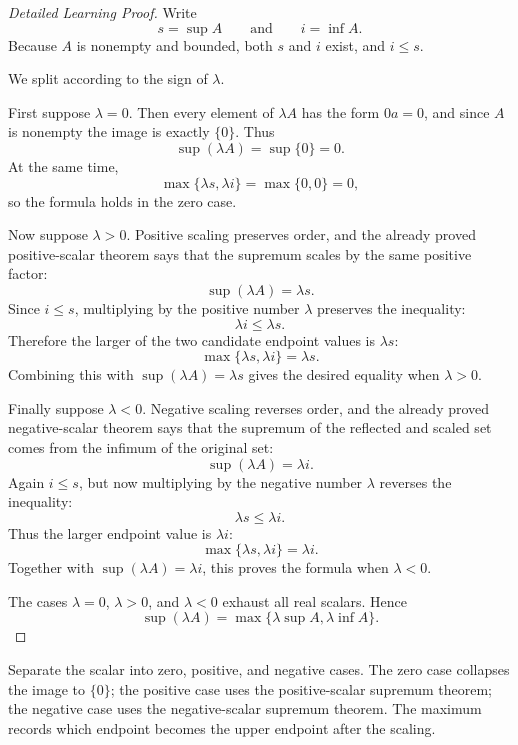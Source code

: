 \begin{proof}[Detailed Learning Proof]
\LRAProofBodyStart
Write
\[
  s=\sup A
  \qquad\text{and}\qquad
  i=\inf A.
\]
Because $A$ is nonempty and bounded, both $s$ and $i$ exist, and
$i\le s$.

We split according to the sign of $\lambda$.

First suppose $\lambda=0$. Then every element of $\lambda A$ has the form
$0a=0$, and since $A$ is nonempty the image is exactly $\{0\}$. Thus
\[
  \sup(\lambda A)=\sup\{0\}=0.
\]
At the same time,
\[
  \max\{\lambda s,\lambda i\}=\max\{0,0\}=0,
\]
so the formula holds in the zero case.

Now suppose $\lambda>0$. Positive scaling preserves order, and the already
proved positive-scalar theorem says that the supremum scales by the same
positive factor:
\[
  \sup(\lambda A)=\lambda s.
\]
Since $i\le s$, multiplying by the positive number $\lambda$ preserves the
inequality:
\[
  \lambda i\le \lambda s.
\]
Therefore the larger of the two candidate endpoint values is $\lambda s$:
\[
  \max\{\lambda s,\lambda i\}=\lambda s.
\]
Combining this with $\sup(\lambda A)=\lambda s$ gives the desired equality
when $\lambda>0$.

Finally suppose $\lambda<0$. Negative scaling reverses order, and the already
proved negative-scalar theorem says that the supremum of the reflected and
scaled set comes from the infimum of the original set:
\[
  \sup(\lambda A)=\lambda i.
\]
Again $i\le s$, but now multiplying by the negative number $\lambda$ reverses
the inequality:
\[
  \lambda s\le \lambda i.
\]
Thus the larger endpoint value is $\lambda i$:
\[
  \max\{\lambda s,\lambda i\}=\lambda i.
\]
Together with $\sup(\lambda A)=\lambda i$, this proves the formula when
$\lambda<0$.

The cases $\lambda=0$, $\lambda>0$, and $\lambda<0$ exhaust all real scalars.
Hence
\[
  \sup(\lambda A)=\max\{\lambda\sup A,\lambda\inf A\}.
\]
\end{proof}

\begin{remark*}
Separate the scalar into zero, positive, and negative cases. The zero case
collapses the image to $\{0\}$; the positive case uses the positive-scalar
supremum theorem; the negative case uses the negative-scalar supremum theorem.
The maximum records which endpoint becomes the upper endpoint after the
scaling.
\end{remark*}

